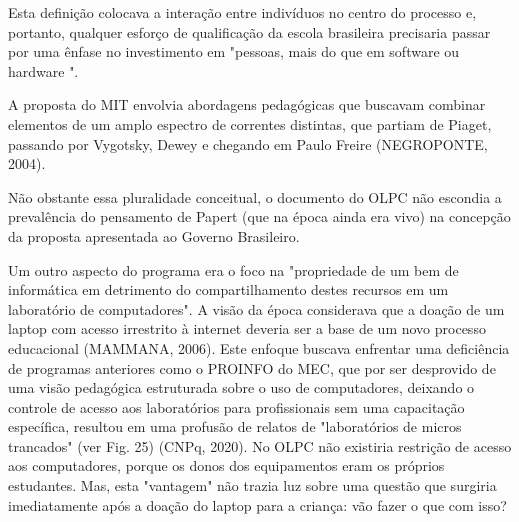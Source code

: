 Esta definição colocava a interação entre indivíduos no centro do processo e, portanto, qualquer esforço de qualificação da escola brasileira precisaria passar por uma ênfase no investimento em "pessoas, mais do que em software ou hardware ".

A proposta do MIT envolvia abordagens pedagógicas que buscavam combinar elementos de um amplo espectro de correntes distintas, que partiam de Piaget, passando por Vygotsky, Dewey e chegando em Paulo Freire  (NEGROPONTE, 2004).

Não obstante essa pluralidade conceitual, o documento do OLPC não escondia a prevalência do pensamento de Papert (que na época ainda era vivo) na concepção da proposta apresentada ao Governo Brasileiro.


\noindent\begin{center}\mbox{\centering{}}\end{center}


Um outro aspecto do programa era o foco na "propriedade de um bem de informática em detrimento do compartilhamento destes recursos em um laboratório de computadores". A visão da época considerava que a doação de um laptop com acesso irrestrito à internet deveria ser a base de um novo processo educacional (MAMMANA, 2006). Este enfoque buscava enfrentar uma deficiência de programas anteriores como o PROINFO do MEC, que por ser desprovido de uma visão pedagógica estruturada sobre o uso de computadores, deixando o controle de acesso aos laboratórios para profissionais sem uma capacitação específica, resultou em uma profusão de relatos de "laboratórios de micros trancados" (ver Fig. 25)  (CNPq, 2020). No OLPC não existiria restrição de acesso aos computadores, porque os donos dos equipamentos eram os próprios estudantes. Mas, esta "vantagem" não trazia luz sobre  uma questão que surgiria imediatamente após a doação do laptop para a criança: vão fazer o que com isso?



